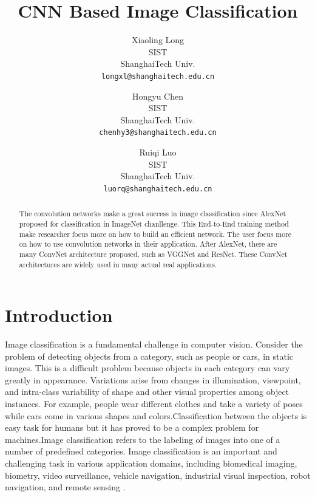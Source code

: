 \documentclass[10pt,twocolumn,letterpaper]{article}
\begin{document}
\title{	CNN Based Image Classification}

\author{Xiaoling Long\\
SIST\\
ShanghaiTech Univ.\\
{\tt\small longxl@shanghaitech.edu.cn}
\and
Hongyu Chen\\
SIST\\
ShanghaiTech Univ.\\
{\tt\small chenhy3@shanghaitech.edu.cn}
\and
Ruiqi Luo\\
SIST\\
ShanghaiTech Univ.\\
{\tt\small luorq@shanghaitech.edu.cn}
}


\maketitle

\begin{abstract}
   The convolution networks make a great success in image classification since AlexNet proposed for classification in ImageNet chanllenge. This End-to-End training method make researcher focus more on how to build an efficient network. The user focus more on how to use convolution networks in their application. After AlexNet, there are many ConvNet architecture proposed, such as VGGNet  and ResNet. These ConvNet architectures are widely  used in many actual real applications.
\end{abstract}

\section{Introduction}
Image classification is a fundamental challenge in computer vision\cite{felzenszwalb2013visual}. Consider the problem of detecting objects from a category, such as people or cars, in static images. This is a difficult problem because objects in each category can vary greatly in appearance. Variations arise from changes in illumination, viewpoint, and intra-class variability of shape and other visual properties among object instances. For example, people wear different clothes and take a variety of poses while cars come in various shapes and colors.Classification   between   the   objects   is   easy   task   for  humans  but  it  has  proved  to  be  a  complex  problem for machines.Image classification refers to the labeling of images into one of a number of predefined categories.
Image classification is an important and challenging task in various application domains, including biomedical imaging, biometry, video surveillance, vehicle navigation, industrial visual inspection, robot navigation, and remote sensing \cite{kamavisdar2013survey}.
\end{document}
